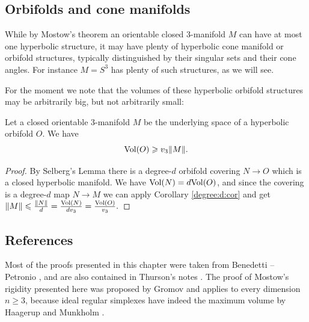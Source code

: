\subsection{Orbifolds and cone manifolds}
While by Mostow's theorem an orientable closed 3-manifold $M$ can have at most one hyperbolic structure, it may have plenty of hyperbolic cone manifold or orbifold structures, typically distinguished by their singular sets and their cone angles. For instance $M=S^3$ has plenty of such structures, as we will see.

For the moment we note that the volumes of these hyperbolic orbifold structures may be arbitrarily big, but not arbitrarily small:

\begin{prop} \label{Vol:M:O:prop}
Let a closed orientable 3-manifold $M$ be the underlying space of a hyperbolic orbifold $O$. We have
$${\rm Vol}(O) \geqslant v_3\|M\|.$$
\end{prop}
\begin{proof}
By Selberg's Lemma there is a degree-$d$ orbifold covering $N \to O$ which is a closed hyperbolic manifold. We have ${\rm Vol}(N) = d{\rm Vol}(O)$, and since the covering is a degree-$d$ map $N \to M$ we can apply Corollary \ref{degree:d:cor} and get $\|M\| \leqslant \frac{\|N\|}d = \frac{{\rm Vol}(N)}{dv_3} = \frac{{\rm Vol}(O)}{v_3}.$
\end{proof}

\subsection{References}
Most of the proofs presented in this chapter were taken from Benedetti -- Petronio \cite{BP}, and are also contained in Thurson's notes \cite{Th}. The proof of Mostow's rigidity presented here was proposed by Gromov and applies to every dimension $n\geqslant 3$, because ideal regular simplexes have indeed the maximum volume by Haagerup and Munkholm \cite{HM}. 
